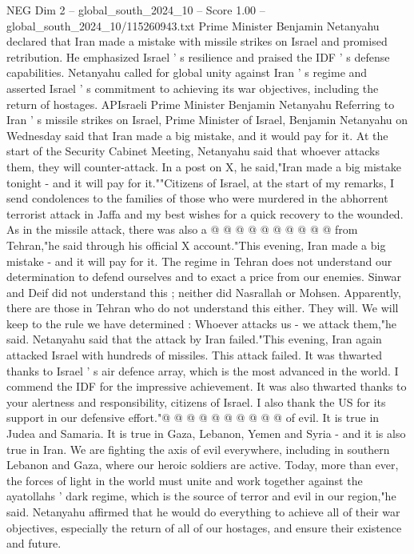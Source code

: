 \begin{textsample}{NEG Dim 2 – global\_south\_2024\_10 – Score 1.00 – global\_south\_2024\_10/115260943.txt}  \label{ex:f2_neg_312}
Prime Minister Benjamin Netanyahu declared that Iran made a mistake with missile strikes on Israel and promised retribution.
He emphasized Israel ' s resilience and praised the IDF ' s defense capabilities.
Netanyahu called for global unity against Iran ' s regime and asserted Israel ' s commitment to achieving its war objectives, including the return of hostages.
APIsraeli Prime Minister Benjamin Netanyahu Referring to Iran ' s missile strikes on Israel, Prime Minister of Israel, Benjamin Netanyahu on Wednesday said that Iran made a big mistake, and it would pay for it.
At the start of the Security Cabinet Meeting, Netanyahu said that whoever attacks them, they will counter-attack.
In a post on X, he said,"Iran made a big mistake tonight - and it will pay for it.""Citizens of Israel, at the start of my remarks, I send condolences to the families of those who were murdered in the abhorrent terrorist attack in Jaffa and my best wishes for a quick recovery to the wounded.
As in the missile attack, there was also a @ @ @ @ @ @ @ @ @ @ from Tehran,"he said through his official X account."This evening, Iran made a big mistake - and it will pay for it.
The regime in Tehran does not understand our determination to defend ourselves and to exact a price from our enemies.
Sinwar and Deif did not understand this ; neither did Nasrallah or Mohsen.
Apparently, there are those in Tehran who do not understand this either.
They will.
We will keep to the rule we have determined : Whoever attacks us - we attack them,"he said.
Netanyahu said that the attack by Iran failed."This evening, Iran again attacked Israel with hundreds of missiles.
This attack failed.
It was thwarted thanks to Israel ' s air defence array, which is the most advanced in the world.
I commend the IDF for the impressive achievement.
It was also thwarted thanks to your alertness and responsibility, citizens of Israel.
I also thank the US for its support in our defensive effort."@ @ @ @ @ @ @ @ @ @ of evil.
It is true in Judea and Samaria.
It is true in Gaza, Lebanon, Yemen and Syria - and it is also true in Iran.
We are fighting the axis of evil everywhere, including in southern Lebanon and Gaza, where our heroic soldiers are active.
Today, more than ever, the forces of light in the world must unite and work together against the ayatollahs ' dark regime, which is the source of terror and evil in our region,"he said.
Netanyahu affirmed that he would do everything to achieve all of their war objectives, especially the return of all of our hostages, and ensure their existence and future.

\end{textsample}
